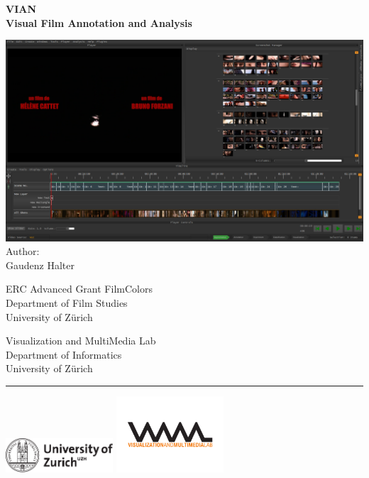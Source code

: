 \documentclass[11pt, a4paper,oneside,chapterprefix=false]{scrbook}
\begin{document}
\frontmatter
\begin{titlepage}
	\setlength{\parindent}{0cm}
	\addtolength{\textheight}{1.0cm}

	\vspace{0.5cm}
	\Huge
	{\textbf \textsf{VIAN\\ \huge Visual Film Annotation and Analysis}}

	\vfill\vfill\vfill
	\vfill
	\includegraphics*[width=1.0\textwidth]{figures/vian_02.png}
	\vfill \vfill \vfill
	\large
	Author:\\
	Gaudenz Halter\\
	
	
	
	


	\begin{minipage}[b]{0.5\textwidth}
	ERC Advanced Grant FilmColors\\
	Department of Film Studies \\
	University of Z{\"u}rich
	\end{minipage}
	\begin{minipage}[b]{0.5\textwidth} \raggedleft
	Visualization and MultiMedia Lab \\
	Department of Informatics \\
	University of Z{\"u}rich
	\end{minipage}

	\vfill
	\hrule
	\vspace{0.5cm}
	\includegraphics*[width=0.3\textwidth]{figures/uzh_logo} \hfill
	\includegraphics*[width=0.3\textwidth]{figures/vmml_logo}

\end{titlepage}
\end{document}
